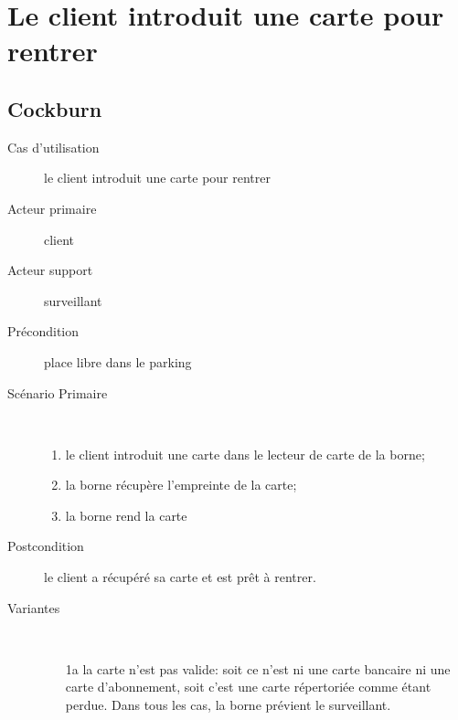 \documentclass[a4paper]{article}
\begin{document}
\newpage

\section{Le client introduit une carte pour rentrer}
\subsection{Cockburn}
\begin{description}
	\item[Cas d'utilisation] le client introduit une carte pour rentrer
	\item[Acteur primaire] client
	\item[Acteur support] surveillant
	\item[Pr\'econdition] place libre dans le parking
	\item[Sc\'enario Primaire] \
	\begin{enumerate}
		\item le client introduit une carte dans le lecteur de carte de la borne;
		\item la borne r\'ecup\`ere l'empreinte de la carte;
		\item la borne rend la carte
	\end{enumerate}
	\item[Postcondition] le client a r\'ecup\'er\'e sa carte et est pr\^et \`a rentrer.
	\item[Variantes] \
	\begin{enumerate}
		\item[1a] la carte n'est pas valide: soit ce n'est ni une carte bancaire
			ni une carte d'abonnement, soit c'est une carte r\'epertori\'ee
			comme \'etant perdue. Dans tous les cas, la borne pr\'evient le
			surveillant.
	\end{enumerate}
\end{description}
\end{document}

